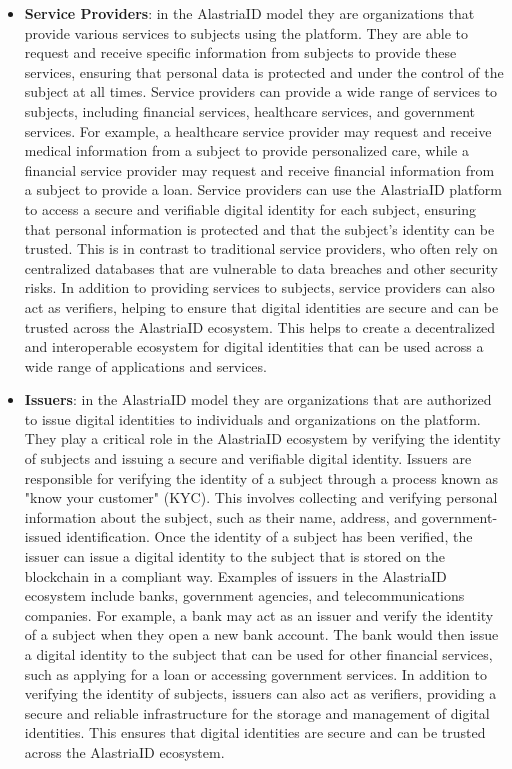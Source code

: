 \documentclass[target=mst,aauheader=]{thud}
\begin{document}
\begin{itemize}
    \item \textbf{Service Providers}: in the AlastriaID model they are organizations that provide various services to subjects using the platform. They are able to request and receive specific information from subjects to provide these services, ensuring that personal data is protected and under the control of the subject at all times. Service providers can provide a wide range of services to subjects, including financial services, healthcare services, and government services. For example, a healthcare service provider may request and receive medical information from a subject to provide personalized care, while a financial service provider may request and receive financial information from a subject to provide a loan.
        Service providers can use the AlastriaID platform to access a secure and verifiable digital identity for each subject, ensuring that personal information is protected and that the subject's identity can be trusted. This is in contrast to traditional service providers, who often rely on centralized databases that are vulnerable to data breaches and other security risks.
        In addition to providing services to subjects, service providers can also act as verifiers, helping to ensure that digital identities are secure and can be trusted across the AlastriaID ecosystem. This helps to create a decentralized and interoperable ecosystem for digital identities that can be used across a wide range of applications and services.

    \item \textbf{Issuers}: in the AlastriaID model they are organizations that are authorized to issue digital identities to individuals and organizations on the platform. They play a critical role in the AlastriaID ecosystem by verifying the identity of subjects and issuing a secure and verifiable digital identity. Issuers are responsible for verifying the identity of a subject through a process known as "know your customer" (KYC). This involves collecting and verifying personal information about the subject, such as their name, address, and government-issued identification. Once the identity of a subject has been verified, the issuer can issue a digital identity to the subject that is stored on the blockchain in a compliant way.
        Examples of issuers in the AlastriaID ecosystem include banks, government agencies, and telecommunications companies. For example, a bank may act as an issuer and verify the identity of a subject when they open a new bank account. The bank would then issue a digital identity to the subject that can be used for other financial services, such as applying for a loan or accessing government services. In addition to verifying the identity of subjects, issuers can also act as verifiers, providing a secure and reliable infrastructure for the storage and management of digital identities. This ensures that digital identities are secure and can be trusted across the AlastriaID ecosystem.
        
\end{itemize}
\end{document}
